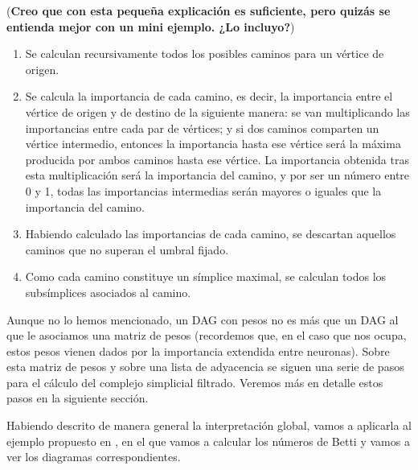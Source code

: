 \documentclass[12pt, a4paper, twoside]{book}
\numberwithin{equation}{section}
\theoremstyle{definition}
\theoremstyle{remark}
\theoremstyle{plain}
\begin{document}
	(\textbf{Creo que con esta pequeña explicación es suficiente, pero 
	quizás se entienda mejor con un mini ejemplo. ¿Lo incluyo?})

	\begin{enumerate}[label=\arabic*)]
		\item Se calculan recursivamente todos los posibles caminos 
			para un vértice de origen. 
		\item Se calcula la importancia de cada camino, es decir, la 
			importancia entre el vértice de origen y de destino de 
			la siguiente manera: se van multiplicando las 
			importancias entre cada par de vértices; y si dos 
			caminos comparten un vértice intermedio, entonces la 
			importancia hasta ese vértice será la máxima producida 
			por ambos caminos hasta ese vértice. La importancia 
			obtenida tras esta multiplicación será la importancia 
			del camino, y por ser un número entre 0 y 1, todas las
			importancias intermedias serán mayores o iguales que 
			la importancia del camino.
		\item Habiendo calculado las importancias de cada camino, se 
			descartan aquellos caminos que no superan el
			umbral fijado.
		\item Como cada camino constituye un símplice maximal, se 
			calculan todos los subsímplices
			asociados al camino.
	\end{enumerate}

	Aunque no lo hemos mencionado, un DAG con pesos no es más que un DAG
	al que le asociamos una matriz de pesos (recordemos que, en el caso 
	que nos ocupa, estos pesos vienen dados por la importancia extendida 
	entre neuronas). Sobre esta matriz de pesos y sobre una lista de 
	adyacencia se siguen una serie de pasos para el cálculo del complejo 
	simplicial filtrado. Veremos más en detalle estos pasos en la 
	siguiente sección. 

	Habiendo descrito de manera general la interpretación global, vamos a 
	aplicarla al ejemplo propuesto en \cite{Articulo-Watanabe}, en el que 
	vamos a calcular los números de Betti y vamos a ver los diagramas 
	correspondientes.
\end{document}
